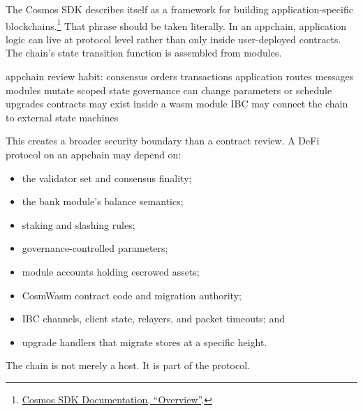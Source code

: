 The Cosmos SDK describes itself as a framework for building application-specific blockchains.\footnote{\href{https://docs.cosmos.network/sdk/latest/learn/intro/overview}{Cosmos SDK Documentation, ``Overview''}.} That phrase should be taken literally. In an appchain, application logic can live at protocol level rather than only inside user-deployed contracts. The chain's state transition function is assembled from modules.

\begin{codeblock}
appchain review habit:
    consensus orders transactions
    application routes messages
    modules mutate scoped state
    governance can change parameters or schedule upgrades
    contracts may exist inside a wasm module
    IBC may connect the chain to external state machines
\end{codeblock}

This creates a broader security boundary than a contract review. A DeFi protocol on an appchain may depend on:

\begin{itemize}
\item the validator set and consensus finality;
\item the bank module's balance semantics;
\item staking and slashing rules;
\item governance-controlled parameters;
\item module accounts holding escrowed assets;
\item CosmWasm contract code and migration authority;
\item IBC channels, client state, relayers, and packet timeouts; and
\item upgrade handlers that migrate stores at a specific height.
\end{itemize}

The chain is not merely a host. It is part of the protocol.

